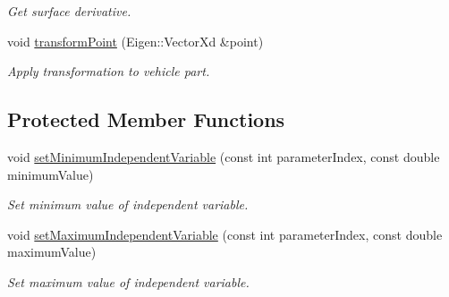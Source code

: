 \begin{DoxyCompactItemize}
\begin{DoxyCompactList}\small\item\em Get surface derivative. \end{DoxyCompactList}\item 
void \hyperlink{classtudat_1_1geometric__shapes_1_1SingleSurfaceGeometry_aaa8631cc37a83c042e39fc2ebc87fc91}{transform\+Point} (Eigen\+::\+Vector\+Xd \&point)
\begin{DoxyCompactList}\small\item\em Apply transformation to vehicle part. \end{DoxyCompactList}\end{DoxyCompactItemize}
\subsection*{Protected Member Functions}
\begin{DoxyCompactItemize}
\item 
void \hyperlink{classtudat_1_1geometric__shapes_1_1SingleSurfaceGeometry_aec4e218b11c994b5bfc451dace813b6c}{set\+Minimum\+Independent\+Variable} (const int parameter\+Index, const double minimum\+Value)
\begin{DoxyCompactList}\small\item\em Set minimum value of independent variable. \end{DoxyCompactList}\item 
void \hyperlink{classtudat_1_1geometric__shapes_1_1SingleSurfaceGeometry_aaefc36efe1b4f165628a1e6bcd5ce8b0}{set\+Maximum\+Independent\+Variable} (const int parameter\+Index, const double maximum\+Value)
\begin{DoxyCompactList}\small\item\em Set maximum value of independent variable. \end{DoxyCompactList}\end{DoxyCompactItemize}
